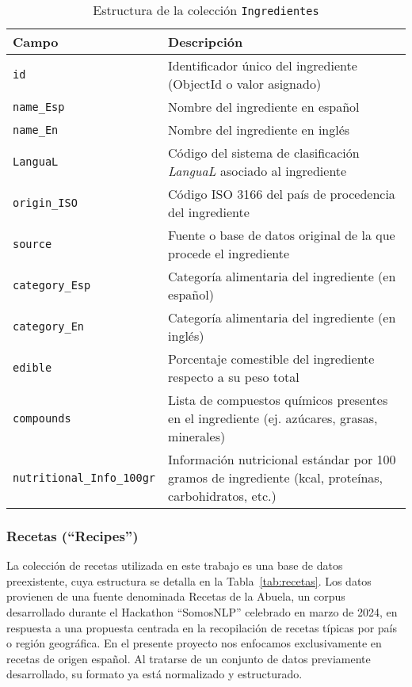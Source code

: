 \begin{table}[t]
    \centering
    \begin{tabular}{|l|p{8cm}|}
        \hline
        \textbf{Campo} & \textbf{Descripción} \\
        \hline
        \texttt{id} & Identificador único del ingrediente (ObjectId o valor asignado) \\
        \hline
        \texttt{name\_Esp} & Nombre del ingrediente en español \\
        \hline
        \texttt{name\_En} & Nombre del ingrediente en inglés \\
        \hline
        \texttt{LanguaL} & Código del sistema de clasificación \textit{LanguaL} asociado al ingrediente \\
        \hline
        \texttt{origin\_ISO} & Código ISO 3166 del país de procedencia del ingrediente \\
        \hline
        \texttt{source} & Fuente o base de datos original de la que procede el ingrediente \\
        \hline
        \texttt{category\_Esp} & Categoría alimentaria del ingrediente (en español) \\
        \hline
        \texttt{category\_En} & Categoría alimentaria del ingrediente (en inglés) \\
        \hline
        \texttt{edible} & Porcentaje comestible del ingrediente respecto a su peso total \\
        \hline
        \texttt{compounds} & Lista de compuestos químicos presentes en el ingrediente (ej. azúcares, grasas, minerales) \\
        \hline
        \texttt{nutritional\_Info\_100gr} & Información nutricional estándar por 100 gramos de ingrediente (kcal, proteínas, carbohidratos, etc.) \\
        \hline
    \end{tabular}
    \caption{Estructura de la colección \texttt{Ingredientes}}
    \label{tab:ingredientes}
\end{table}


\subsubsection{Recetas (``Recipes'')}
La colección de recetas utilizada en este trabajo es una base de datos preexistente, cuya estructura se detalla en la Tabla~\ref{tab:recetas}. Los datos provienen de una fuente denominada Recetas de la Abuela, un corpus desarrollado durante el Hackathon “SomosNLP” celebrado en marzo de 2024, en respuesta a una propuesta centrada en la recopilación de recetas típicas por país o región geográfica. En el presente proyecto nos enfocamos exclusivamente en recetas de origen español. Al tratarse de un conjunto de datos previamente desarrollado, su formato ya está normalizado y estructurado.

